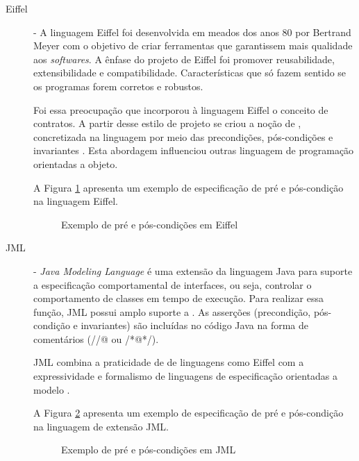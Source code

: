 \begin{description}
\item[Eiffel] - A linguagem Eiffel foi desenvolvida em meados dos anos 80 por
Bertrand Meyer \cite{meyer1988eiffel} com o objetivo de criar ferramentas que
garantissem mais qualidade aos \textit{softwares}. A ênfase do projeto de
Eiffel foi promover reusabilidade, extensibilidade e compatibilidade.
Características que só fazem sentido se os programas forem corretos e
robustos.

Foi essa preocupação que incorporou à linguagem Eiffel o conceito de contratos.
A partir desse estilo de projeto se criou a noção de \designbycontract{},
concretizada na linguagem por meio das precondições, pós-condições e invariantes
\cite{meyer1988eiffel}. Esta abordagem influenciou outras linguagem de programação orientadas a objeto.

A Figura \ref{lst:exemploEiffel} apresenta um exemplo de especificação de pré e
pós-condição na linguagem Eiffel.

\vspace{6mm}

\begin{figure}[h]
\begin{small}

\vspace{-.5cm}
\end{small}
\caption{Exemplo de pré e pós-condições em Eiffel}
\label{lst:exemploEiffel}
\end{figure}


\item[JML] - \textit{Java Modeling Language} é uma extensão da linguagem Java
para suporte a especificação comportamental de interfaces, ou seja, controlar o
comportamento de classes em tempo de execução. Para realizar essa função, JML
possui amplo suporte a \designbycontract{}. As asserções (precondição,
pós-condição e invariantes) são incluídas no código Java na forma de comentários
(//@ ou /*@\ldots@*/).

JML combina a praticidade de \designbycontract{} de linguagens como Eiffel com a
expressividade e formalismo de linguagens de especificação orientadas a modelo
\cite{leavens2006design}. 

A Figura \ref{lst:exemploJML} apresenta um exemplo de especificação de pré e
pós-condição na linguagem de extensão JML.

\begin{figure}[h]
\begin{small}

\vspace{-.5cm}
\end{small}
\caption{Exemplo de pré e pós-condições em JML}
\label{lst:exemploJML}
\end{figure} 
 

\end{description}
